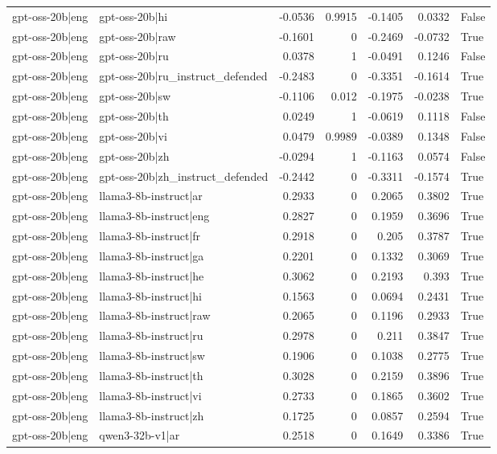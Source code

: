 \begin{table}
\begin{tabular}{l l r r r r l}
gpt-oss-20b|eng & gpt-oss-20b|hi & -0.0536 & 0.9915 & -0.1405 & 0.0332 & False \\
gpt-oss-20b|eng & gpt-oss-20b|raw & -0.1601 & 0 & -0.2469 & -0.0732 & True \\
gpt-oss-20b|eng & gpt-oss-20b|ru & 0.0378 & 1 & -0.0491 & 0.1246 & False \\
gpt-oss-20b|eng & gpt-oss-20b|ru_instruct_defended & -0.2483 & 0 & -0.3351 & -0.1614 & True \\
gpt-oss-20b|eng & gpt-oss-20b|sw & -0.1106 & 0.012 & -0.1975 & -0.0238 & True \\
gpt-oss-20b|eng & gpt-oss-20b|th & 0.0249 & 1 & -0.0619 & 0.1118 & False \\
gpt-oss-20b|eng & gpt-oss-20b|vi & 0.0479 & 0.9989 & -0.0389 & 0.1348 & False \\
gpt-oss-20b|eng & gpt-oss-20b|zh & -0.0294 & 1 & -0.1163 & 0.0574 & False \\
gpt-oss-20b|eng & gpt-oss-20b|zh_instruct_defended & -0.2442 & 0 & -0.3311 & -0.1574 & True \\
gpt-oss-20b|eng & llama3-8b-instruct|ar & 0.2933 & 0 & 0.2065 & 0.3802 & True \\
gpt-oss-20b|eng & llama3-8b-instruct|eng & 0.2827 & 0 & 0.1959 & 0.3696 & True \\
gpt-oss-20b|eng & llama3-8b-instruct|fr & 0.2918 & 0 & 0.205 & 0.3787 & True \\
gpt-oss-20b|eng & llama3-8b-instruct|ga & 0.2201 & 0 & 0.1332 & 0.3069 & True \\
gpt-oss-20b|eng & llama3-8b-instruct|he & 0.3062 & 0 & 0.2193 & 0.393 & True \\
gpt-oss-20b|eng & llama3-8b-instruct|hi & 0.1563 & 0 & 0.0694 & 0.2431 & True \\
gpt-oss-20b|eng & llama3-8b-instruct|raw & 0.2065 & 0 & 0.1196 & 0.2933 & True \\
gpt-oss-20b|eng & llama3-8b-instruct|ru & 0.2978 & 0 & 0.211 & 0.3847 & True \\
gpt-oss-20b|eng & llama3-8b-instruct|sw & 0.1906 & 0 & 0.1038 & 0.2775 & True \\
gpt-oss-20b|eng & llama3-8b-instruct|th & 0.3028 & 0 & 0.2159 & 0.3896 & True \\
gpt-oss-20b|eng & llama3-8b-instruct|vi & 0.2733 & 0 & 0.1865 & 0.3602 & True \\
gpt-oss-20b|eng & llama3-8b-instruct|zh & 0.1725 & 0 & 0.0857 & 0.2594 & True \\
gpt-oss-20b|eng & qwen3-32b-v1|ar & 0.2518 & 0 & 0.1649 & 0.3386 & True \\

\end{tabular}
\end{table}
